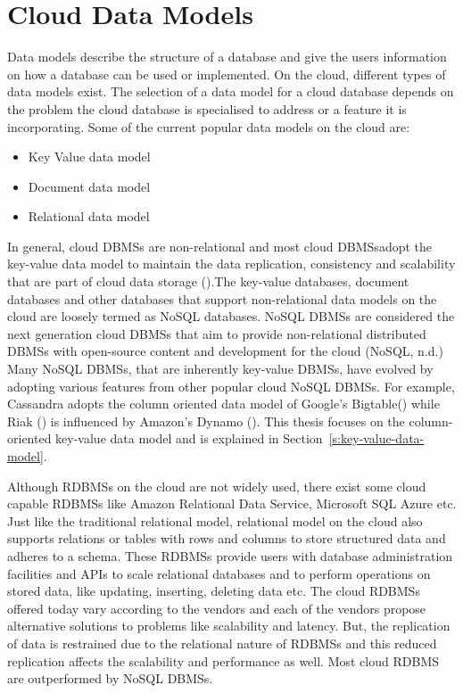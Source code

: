 \section{Cloud Data Models}\label{s:cloud-data-models}
Data models describe the structure of a database and give the users information
on how a database can be used or implemented. On the cloud, different types of
data models exist. The selection of a data model for a cloud database depends on
the problem the cloud database is specialised to address or a feature it is
incorporating. Some of the current popular data models on the cloud are:

\begin{itemize}
\item Key Value data model 

\item Document data model 

\item Relational data model
\end{itemize}

In general, cloud \acp{DBMS} are non-relational and most cloud \acp{DBMS}adopt
the key-value data model to maintain the data replication, consistency and
scalability that are part of cloud data storage ().The key-value
databases, document databases and other databases that support non-relational data models
on the cloud are loosely termed as \ac{NoSQL} databases. \ac{NoSQL} \acp{DBMS}
are considered the next generation cloud \acp{DBMS} that aim to provide
non-relational distributed \acp{DBMS} with open-source content and development
for the cloud (\ac{NoSQL}, n.d.) Many \ac{NoSQL} \acp{DBMS}, that are inherently
key-value \acp{DBMS}, have evolved by adopting various features from other
popular cloud \ac{NoSQL} \acp{DBMS}. For example, Cassandra adopts the column
oriented data model of Google's Bigtable() while Riak () is influenced by
Amazon's Dynamo (). This thesis focuses on the 
column-oriented key-value data model and is explained in
Section~\ref{s:key-value-data-model}.

Although \acp{RDBMS} on the cloud are not widely used, there exist some cloud
capable \acp{RDBMS} like Amazon Relational Data Service, Microsoft SQL Azure
etc. Just like the traditional relational model, relational model on the cloud
also supports relations or tables with rows and columns to store structured data
and adheres to a schema. These \acp{RDBMS} provide users with database
administration facilities and APIs to scale relational databases and to perform
operations on stored data, like updating, inserting, deleting data etc. The
cloud \acp{RDBMS} offered today vary according to the vendors and each of the vendors
propose alternative solutions to problems like scalability and latency. But, the
replication of data is restrained due to the relational nature of \acp{RDBMS} and this reduced
replication affects the scalability and performance as well. Most cloud
\ac{RDBMS} are outperformed by \ac{NoSQL} \acp{DBMS}.

